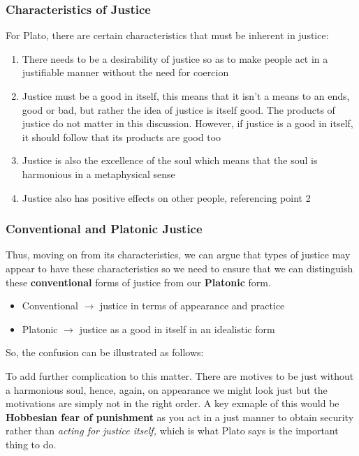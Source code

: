 \documentclass[12pt, letterpaper]{article}
\begin{document}
\subsubsection{Characteristics of Justice}
For Plato, there are certain characteristics that must be inherent in justice: 
\begin{enumerate}
	\item There needs to be a desirability of justice so as to make people act in a justifiable manner without the need for coercion
	\item Justice must be a good in itself, this means that it isn't a means to an ends, good or bad, but rather the idea of justice is itself good. The products of justice do not matter in this discussion. However, if justice is a good in itself, it should follow that its products are good too
	\item Justice is also the excellence of the soul which means that the soul is harmonious in a metaphysical sense
	\item Justice also has positive effects on other people, referencing point 2
\end{enumerate}

\subsubsection{Conventional and Platonic Justice}
Thus, moving on from its characteristics, we can argue that types of justice may appear to have these characteristics so we need to ensure that we can distinguish these \textbf{conventional} forms of justice from our \textbf{Platonic} form.
\begin{itemize}
	\item Conventional $\rightarrow$ justice in terms of appearance and practice
	\item Platonic $\rightarrow$ justice as a good in itself in an idealistic form
\end{itemize}
So, the confusion can be illustrated as follows:
\begin{center}
	\noindent{}
\end{center}
To add further complication to this matter. There are motives to be just without a harmonious soul, hence, again, on appearance we might look just but the motivations are simply not in the right order. A key exmaple of this would be \textbf{Hobbesian fear of punishment} as you act in a just manner to obtain security rather than \textit{acting for justice itself,} which is what Plato says is the important thing to do.
\end{document}

